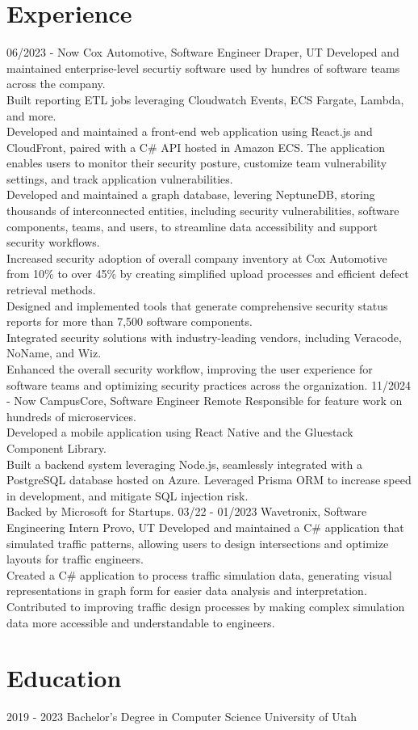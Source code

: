 \documentclass[]{friggeri-cv}
\begin{document}
\section{Experience}
\begin{entrylist}
	  \entry
	{06/2023 - Now}
	{Cox Automotive, Software Engineer}
	{Draper, UT}
	{ 
      Developed and maintained enterprise-level securtiy software used by hundres of software teams across the company. 
    \\Built reporting ETL jobs leveraging Cloudwatch Events, ECS Fargate, Lambda, and more. 
    \\Developed and maintained a front-end web application using React.js and CloudFront, paired with a C\# API hosted in Amazon ECS. The application enables users to monitor their security posture, customize team vulnerability settings, and track application vulnerabilities. 
    \\Developed and maintained a graph database, levering NeptuneDB, storing thousands of interconnected entities, including security vulnerabilities, software components, teams, and users, to streamline data accessibility and support security workflows. 
    \\Increased security adoption of overall company inventory at Cox Automotive from 10\% to over 45\% by creating simplified upload processes and efficient defect retrieval methods. 
    \\Designed and implemented tools that generate comprehensive security status reports for more than 7,500 software components.
    \\Integrated security solutions with industry-leading vendors, including Veracode, NoName, and Wiz.
    \\Enhanced the overall security workflow, improving the user experience for software teams and optimizing security practices across the organization.
  }
  \entry
    {11/2024 - Now}
    {CampusCore, Software Engineer}
    {Remote}
    {Responsible for feature work on hundreds of microservices. 
    \\Developed a mobile application using React Native and the Gluestack Component Library. 
    \\Built a backend system leveraging Node.js, seamlessly integrated with a PostgreSQL database hosted on Azure. Leveraged Prisma ORM to increase speed in development, and mitigate SQL injection risk. 
    \\Backed by Microsoft for Startups. 
    }
  \entry
    {03/22 - 01/2023}
    {Wavetronix, Software Engineering Intern}
    {Provo, UT}
    {Developed and maintained a C\# application that simulated traffic patterns, allowing users to design intersections and optimize layouts for traffic engineers. 
    \\Created a C\# application to process traffic simulation data, generating visual representations in graph form for easier data analysis and interpretation.
    \\Contributed to improving traffic design processes by making complex simulation data more accessible and understandable to engineers.
    }
\end{entrylist}

\section{Education}
\begin{entrylist}
  \entry
    {2019 - 2023}
    {Bachelor's Degree in Computer Science}
    {University of Utah}
    {}
\end{entrylist}
\end{document}
